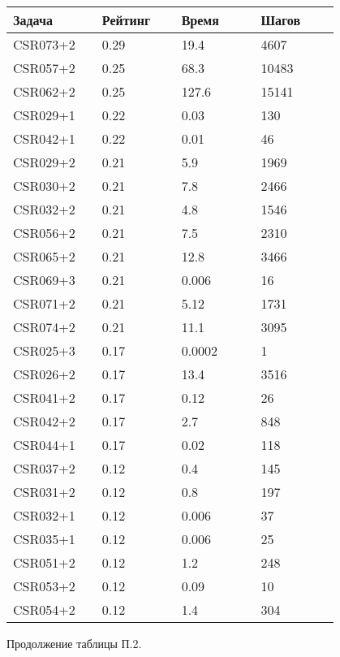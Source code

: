 \begin{longtable}[H]{|p{0.2\linewidth}|p{0.2\linewidth}|p{0.2\linewidth}|p{0.2\linewidth}|}
\hline
\textbf{Задача} & \textbf{Рейтинг} & \textbf{Время} & \textbf{Шагов} \\
\hline
CSR073+2 &  0.29 &  19.4 &  4607 \\
\hline
CSR057+2 &  0.25 &  68.3 &  10483 \\
\hline
CSR062+2 &  0.25 &  127.6 &  15141 \\
\hline
CSR029+1 &  0.22 &  0.03 &  130 \\
\hline
CSR042+1 &  0.22 &  0.01 &  46 \\
\hline
CSR029+2 &  0.21 &  5.9 &  1969 \\
\hline
CSR030+2 &  0.21 &  7.8 &  2466 \\
\hline
CSR032+2 &  0.21 &  4.8 &  1546 \\
\hline
CSR056+2 &  0.21 &  7.5 &  2310 \\
\hline
CSR065+2 &  0.21 &  12.8 &  3466 \\
\hline
CSR069+3 &  0.21 &   0.006 &  16 \\
\hline
CSR071+2 &  0.21 &  5.12 &  1731 \\
\hline
CSR074+2 &  0.21 &  11.1 &  3095 \\
\hline
CSR025+3 &  0.17 &  0.0002 &  1 \\
\hline
CSR026+2 &  0.17 &  13.4 &  3516 \\
\hline
CSR041+2 &  0.17 &  0.12 &  26 \\
\hline
CSR042+2 &  0.17 &  2.7 &  848 \\
\hline
CSR044+1 &  0.17 &  0.02 &  118 \\
\hline
CSR037+2 &  0.12 &  0.4 &  145 \\
\hline
CSR031+2 &  0.12 &  0.8 &  197 \\
\hline
CSR032+1 &  0.12 &  0.006 &  37 \\
\hline
CSR035+1 &  0.12 &  0.006 &  25 \\
\hline
CSR051+2 &  0.12 &  1.2 &  248 \\
\hline
CSR053+2 &  0.12 &  0.09 &  10 \\
\hline
CSR054+2 &  0.12 &  1.4 &  304 \\
\hline
\end{longtable}
\begin{center}
Продолжение таблицы П.2.
\end{center}

